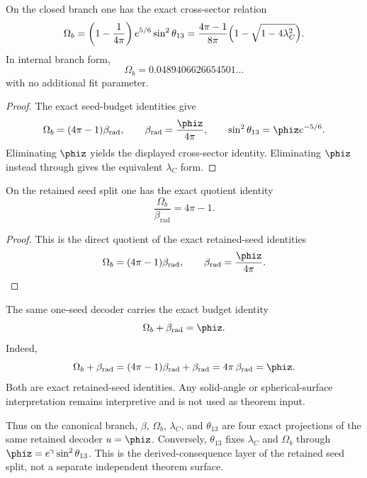 \begin{corollary}
\label{cor:baryon-reactor-bridge-law}
On the closed branch one has the exact cross-sector relation
\[
\Omega_b
=
\left(1-\frac{1}{4\pi}\right)e^{5/6}\sin^2\theta_{13}
=
\frac{4\pi-1}{8\pi}\Bigl(1-\sqrt{1-4\lambda_C^2}\Bigr).
\]
In internal branch form,
\[
\Omega_b=0.0489406626654501\ldots
\]
with no additional fit parameter.
\end{corollary}

\begin{proof}
The exact seed-budget identities give
\[
\Omega_b=(4\pi-1)\beta_{\mathrm{rad}},
\qquad
\beta_{\mathrm{rad}}=\frac{\phiz}{4\pi},
\qquad
\sin^2\theta_{13}=\phiz e^{-5/6}.
\]
Eliminating $\phiz$ yields the displayed cross-sector identity. Eliminating $\phiz$ instead through
 gives the equivalent $\lambda_C$ form.
\end{proof}

\begin{corollary}
\label{cor:matter-radiation-quotient}
On the retained seed split one has the exact quotient identity
\[
\frac{\Omega_b}{\beta_{\mathrm{rad}}}=4\pi-1.
\]
\end{corollary}

\begin{proof}
This is the direct quotient of the exact retained-seed identities
\[
\Omega_b=(4\pi-1)\beta_{\mathrm{rad}},
\qquad
\beta_{\mathrm{rad}}=\frac{\phiz}{4\pi}.
\]
\end{proof}

\begin{remark}
The same one-seed decoder carries the exact budget identity
\begin{equation}
\label{eq:seed-budget-identity}
\Omega_b+\beta_{\mathrm{rad}}=\phiz.
\end{equation}
Indeed,
\[
\Omega_b+\beta_{\mathrm{rad}}
=(4\pi-1)\beta_{\mathrm{rad}}+\beta_{\mathrm{rad}}
=4\pi\,\beta_{\mathrm{rad}}
=\phiz.
\]
Both  are exact retained-seed
identities. Any solid-angle or spherical-surface interpretation remains interpretive and is not
used as theorem input.
\end{remark}

Thus on the canonical branch, $\beta$, $\Omega_b$, $\lambda_C$, and $\theta_{13}$ are four exact
projections of the same retained decoder $u=\phiz$. Conversely, $\theta_{13}$ fixes $\lambda_C$ and
$\Omega_b$ through $\phiz=e^\gamma\sin^2\theta_{13}$. This is the derived-consequence layer of the
retained seed split, not a separate independent theorem surface.

